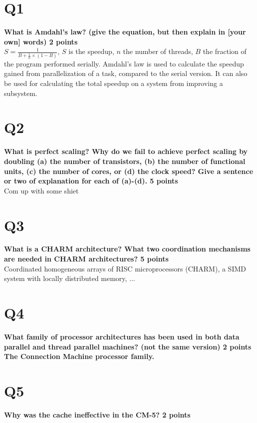\documentclass[a4paper]{article}
\begin{document}

\section*{Q1}
\large{\textbf{What is Amdahl’s law? (give the equation, but then explain in [your own] words) 2 points\\}}
$S=\frac{1}{B + \frac{1}{n}\times(1-B)}$, $S$ is the speedup, $n$ the number of threads, $B$ the fraction of the program performed serially. Amdahl’s law is used to calculate the speedup gained from parallelization of a task, compared to the serial version. It can also be used for calculating the total speedup on a system from improving a subsystem.

\section*{Q2}
\large{\textbf{What is perfect scaling? Why do we fail to achieve perfect scaling by doubling (a) the number of transistors, (b) the number of functional units, (c) the number of cores, or (d) the clock speed? Give a sentence or two of explanation for each of (a)-(d). 5 points\\}}
Com up with some shiet

\section*{Q3}
\large{\textbf{
What is a CHARM architecture? What two coordination mechanisms are needed in CHARM architectures? 5 points\\}}
Coordinated homogeneous arrays of RISC microprocessors (CHARM), a SIMD system with locally distributed memory, ...

\section*{Q4}
\large{\textbf{
What family of processor architectures has been used in both data parallel and thread parallel machines? (not the same version) 2 points
The Connection Machine processor family. \\}}

\section*{Q5}
\large{\textbf{
Why was the cache ineffective in the CM-5? 2 points\\}}
\end{document}
